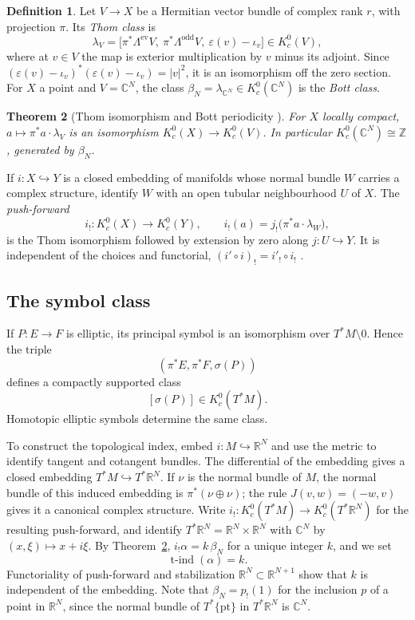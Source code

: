 \documentclass[11pt,oneside,reqno]{book}
\newcommand{\R}{\mathbb R}
\newcommand{\C}{\mathbb C}
\newcommand{\Z}{\mathbb Z}
\theoremstyle{plain}
\newtheorem{theorem}{Theorem}[chapter]
\theoremstyle{definition}
\newtheorem{definition}[theorem]{Definition}
\theoremstyle{remark}
\begin{document}
\begin{definition}\label{def:thom-bott}
Let \(V\to X\) be a Hermitian vector bundle of complex rank \(r\), with
projection \(\pi\).  Its \emph{Thom class} is
\[
 \lambda_V
 =\bigl[\pi^*\Lambda^{\mathrm{ev}}V,\ \pi^*\Lambda^{\mathrm{odd}}V,\
   \varepsilon(v)-\iota_v\bigr]\in K_c^0(V),
\]
where at \(v\in V\) the map is exterior multiplication by \(v\) minus its
adjoint.  Since
\((\varepsilon(v)-\iota_v)^*(\varepsilon(v)-\iota_v)=|v|^2\), it is an
isomorphism off the zero section.  For \(X\) a point and \(V=\C^N\), the
class \(\beta_N=\lambda_{\C^N}\in K_c^0(\C^N)\) is the \emph{Bott class}.
\end{definition}

\begin{theorem}[Thom isomorphism and Bott periodicity \cite{ASI,ABS}]
\label{thm:thom-bott}
For \(X\) locally compact, \(a\mapsto\pi^*a\cdot\lambda_V\) is an
isomorphism \(K_c^0(X)\to K_c^0(V)\).  In particular
\(K_c^0(\C^N)\cong\Z\), generated by \(\beta_N\).
\end{theorem}

If \(i:X\hookrightarrow Y\) is a closed embedding of manifolds whose normal
bundle \(W\) carries a complex structure, identify \(W\) with an open
tubular neighbourhood \(U\) of \(X\).  The \emph{push-forward}
\[
 i_!:K_c^0(X)\longrightarrow K_c^0(Y),
 \qquad
 i_!(a)=j_!\bigl(\pi^*a\cdot\lambda_W\bigr),
\]
is the Thom isomorphism followed by extension by zero along
\(j:U\hookrightarrow Y\).  It is independent of the choices and
functorial, \((i'\circ i)_!=i'_!\circ i_!\) \cite{ASI}.

\subsection*{The symbol class}

If \(P:E\to F\) is elliptic, its principal symbol is an isomorphism over
\(T^*M\setminus0\). Hence the triple
\[
 (\pi^*E,\pi^*F,\sigma(P))
\]
defines a compactly supported class
\[
 [\sigma(P)]\in K_c^0(T^*M).
\]
Homotopic elliptic symbols determine the same class.

To construct the topological index, embed \(i:M\hookrightarrow\R^N\) and
use the metric to identify tangent and cotangent bundles.  The
differential of the embedding gives a closed embedding
\(T^*M\hookrightarrow T^*\R^N\).  If \(\nu\) is the normal bundle of \(M\),
the normal bundle of this induced embedding is \(\pi^*(\nu\oplus\nu)\); the
rule \(J(v,w)=(-w,v)\) gives it a canonical complex structure.  Write
\(i_!:K_c^0(T^*M)\to K_c^0(T^*\R^N)\) for the resulting push-forward, and
identify \(T^*\R^N=\R^N\times\R^N\) with \(\C^N\) by
\((x,\xi)\mapsto x+i\xi\).  By Theorem~\ref{thm:thom-bott},
\(i_!\alpha=k\,\beta_N\) for a unique integer \(k\), and we set
\[
 \operatorname{t\text{-}ind}(\alpha)=k.
\]
Functoriality of push-forward and stabilization
\(\R^N\subset\R^{N+1}\) show that \(k\) is independent of the embedding.
Note that \(\beta_N=p_!(1)\) for the inclusion \(p\) of a point in
\(\R^N\), since the normal bundle of \(T^*\{\mathrm{pt}\}\) in
\(T^*\R^N\) is \(\C^N\).
\end{document}
